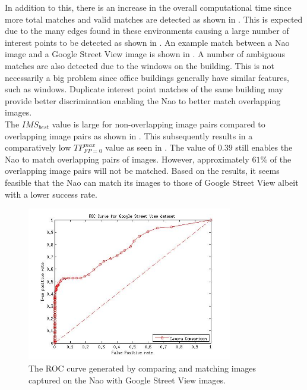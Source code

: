 \documentclass[11pt]{report}
\begin{document}
In addition to this, there is an increase in the overall computational time since more total matches and valid matches are detected as shown in . This is expected due to the many edges found in these environments causing a large number of interest points to be detected as shown in . An example match between a Nao image and a Google Street View image is shown in . A number of ambiguous matches are also detected due to the windows on the building. This is not necessarily a big problem since office buildings generally have similar features, such as windows. Duplicate interest point matches of the same building may provide better discrimination enabling the Nao to better match overlapping images.\\

The $IMS_{best}$ value is large for non-overlapping image pairs compared to overlapping image pairs as shown in . This subsequently results in a comparatively low $TP_{FP=0}^{max}$ value as seen in . The value of $0.39$ still enables the Nao to match overlapping pairs of images. However, approximately $61\%$ of the overlapping image pairs will not be matched. Based on the results, it seems feasible that the Nao can match its images to those of Google Street View albeit with a lower success rate.\\

 \begin{figure}[h!] 
  \centering
    \includegraphics[width=0.8\textwidth]{../Drawings/streetView/ROC_StreetView.jpg}
    \caption{The ROC curve generated by comparing and matching images captured on the Nao with Google Street View images.}
    \label{fig:rocGoogleStreet}
\end{figure}
\end{document}
